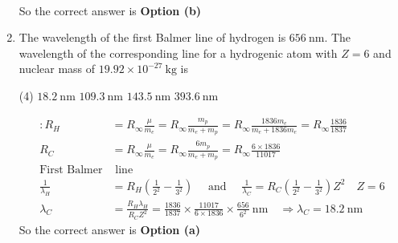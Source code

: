 \begin{enumerate}
\begin{answer}
\begin{align*}
	\end{align*}
		So the correct answer is \textbf{Option (b)}
\end{answer}
\item  The wavelength of the first Balmer line of hydrogen is $656 \mathrm{~nm}$. The wavelength of the corresponding line for a hydrogenic atom with $Z=6$ and nuclear mass of $19.92 \times 10^{-27} \mathrm{~kg}$ is
 \begin{tasks}(4)
	\task[\textbf{a.}] $18.2 \mathrm{~nm}$
	\task[\textbf{b.}]$109.3 \mathrm{~nm}$
	\task[\textbf{c.}]$143.5 \mathrm{~nm}$
	\task[\textbf{d.}]  $393.6 \mathrm{~nm}$
\end{tasks}	
\begin{answer}
	\begin{align*}
	: R_{H}&=R_{\infty} \frac{\mu}{m_{e}}=R_{\infty} \frac{m_{p}}{m_{e}+m_{p}}=R_{\infty} \frac{1836 m_{e}}{m_{e}+1836 m_{e}}=R_{\infty} \frac{1836}{1837}\\
	R_{C}&=R_{\infty} \frac{\mu}{m_{e}}=R_{\infty} \frac{6 m_{p}}{m_{e}+m_{p}}=R_{\infty} \frac{6 \times 1836}{11017}\\
	\text{First Balmer}&\text{ line}\\
	\frac{1}{\lambda_{H}}&=R_{H}\left(\frac{1}{2^{2}}-\frac{1}{3^{2}}\right) \quad \text { and } \quad \frac{1}{\lambda_{C}}=R_{C}\left(\frac{1}{2^{2}}-\frac{1}{3^{2}}\right) Z^{2} \quad Z=6 \\
	\lambda_{C}&=\frac{R_{H} \lambda_{H}}{R_{C} Z^{2}}=\frac{1836}{1837} \times \frac{11017}{6 \times 1836} \times \frac{656}{6^{2}} \mathrm{~nm} \quad \Rightarrow \lambda_{C}=18.2 \mathrm{~nm}
	\end{align*}
		So the correct answer is \textbf{Option (a)}
\end{answer}

\end{enumerate}
